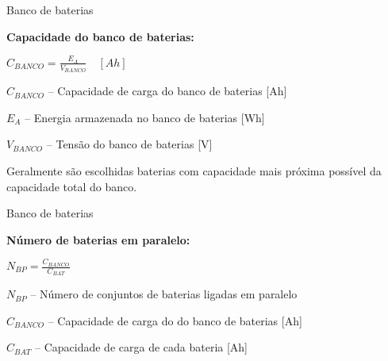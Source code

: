 
\begin{frame}{Banco de baterias}

\textbf{Capacidade do banco de baterias:}

\vspace{.5cm}
\centering

$C_{BANCO} = \frac{E_A}{V_{BANCO}} \quad [Ah]$
\vspace{.25cm}

\justify
$C_{BANCO}$ – Capacidade de carga do banco de baterias [Ah]

$E_A$ – Energia armazenada no banco de baterias [Wh]

$V_{BANCO}$ – Tensão do banco de baterias [V]

\vspace{.25cm}
\begin{exampleblock}{}
\begin{center}
Geralmente são escolhidas baterias com capacidade mais próxima possível da capacidade total do banco.
\end{center} 
\end{exampleblock}

\end{frame}

\begin{frame}{Banco de baterias}

\textbf{Número de baterias em paralelo:}

\vspace{.25cm}
\centering

$N_{BP} = \frac{C_{BANCO}}{C_{BAT}}$
\vspace{.25cm}

\justify
$N_{BP}$ – Número de conjuntos de baterias ligadas em paralelo

$C_{BANCO}$ – Capacidade de carga do do banco de baterias [Ah]

$C_{BAT}$ – Capacidade de carga de cada bateria [Ah]

\end{frame}

